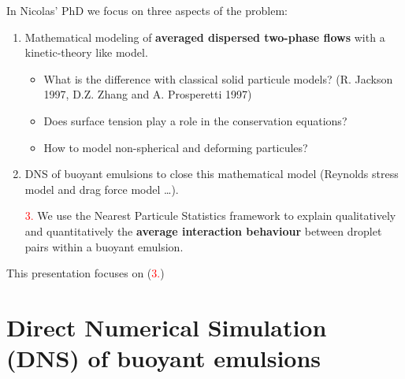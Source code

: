 \documentclass{sintefbeamer}
\begin{document}
\begin{frame}
  {In Nicolas' PhD we focus on three aspects of the problem:}
  \Large
  \begin{enumerate}
    \item Mathematical modeling of \textbf{averaged dispersed two-phase flows} with a kinetic-theory like model. 
    \begin{itemize}
      \item What is the difference with classical solid particule models? (R. Jackson 1997, D.Z. Zhang and A. Prosperetti 1997)
      \item Does surface tension play a role in the conservation equations? 
      \item How to model non-spherical and deforming particules?
    \end{itemize}  
    \item DNS of buoyant emulsions to close this mathematical model (Reynolds stress model and drag force model \ldots). 
    \item[\textcolor{red}{3.}] We use the Nearest Particule Statistics framework to explain qualitatively and quantitatively the \textbf{average interaction behaviour} between droplet pairs within a buoyant emulsion. 
  \end{enumerate}
  This presentation focuses on (\textcolor{red}{3.})
\end{frame}


\section{Direct Numerical Simulation (DNS) of buoyant emulsions}
\section*{}
\end{document}
